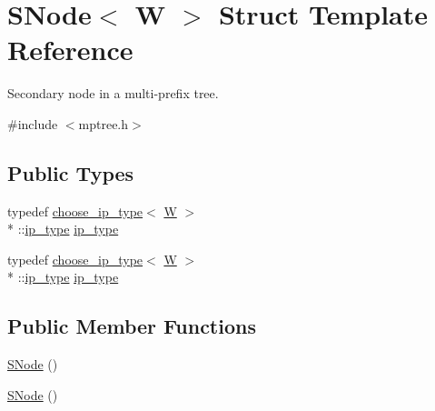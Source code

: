 \hypertarget{structSNode}{\section{S\-Node$<$ W $>$ Struct Template Reference}
\label{structSNode}
}


Secondary node in a multi-\/prefix tree.  




{\ttfamily \#include $<$mptree.\-h$>$}

\subsection*{Public Types}
\begin{DoxyCompactItemize}
\item 
typedef \hyperlink{types_8h_structchoose__ip__type}{choose\-\_\-ip\-\_\-type}$<$ \hyperlink{test__u128_8cpp_ab21b528bc38899d04d3a7053e52fb797}{W} $>$\\*
\-::\hyperlink{structSNode_a1ab678513fb60d997a93e2cff3d45f3b}{ip\-\_\-type} \hyperlink{structSNode_a1ab678513fb60d997a93e2cff3d45f3b}{ip\-\_\-type}
\item 
typedef \hyperlink{types_8h_structchoose__ip__type}{choose\-\_\-ip\-\_\-type}$<$ \hyperlink{test__u128_8cpp_ab21b528bc38899d04d3a7053e52fb797}{W} $>$\\*
\-::\hyperlink{structSNode_a1ab678513fb60d997a93e2cff3d45f3b}{ip\-\_\-type} \hyperlink{structSNode_a1ab678513fb60d997a93e2cff3d45f3b}{ip\-\_\-type}
\end{DoxyCompactItemize}
\subsection*{Public Member Functions}
\begin{DoxyCompactItemize}
\item 
\hyperlink{structSNode_af04c5a67a5d1e5dad406711f83fac4e5}{S\-Node} ()
\item 
\hyperlink{structSNode_af04c5a67a5d1e5dad406711f83fac4e5}{S\-Node} ()
\end{DoxyCompactItemize}
